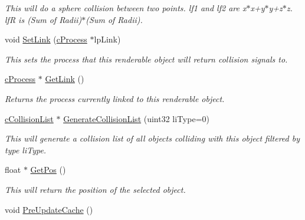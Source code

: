 \begin{DoxyCompactItemize}
\begin{DoxyCompactList}\small\item\em This will do a sphere collision between two points. lf1 and lf2 are x$\ast$x+y$\ast$y+z$\ast$z. lfR is (Sum of Radii)$\ast$(Sum of Radii). \end{DoxyCompactList}\item 
void \hyperlink{classc_collision_object_a69070a16277612a9ac52c84a05d03e80}{SetLink} (\hyperlink{classc_process}{cProcess} $\ast$lpLink)
\begin{DoxyCompactList}\small\item\em This sets the process that this renderable object will return collision signals to. \end{DoxyCompactList}\item 
\hypertarget{classc_collision_object_ad6df8670340c6511beeaaf8fa2f296ec}{
\hyperlink{classc_process}{cProcess} $\ast$ \hyperlink{classc_collision_object_ad6df8670340c6511beeaaf8fa2f296ec}{GetLink} ()}
\label{classc_collision_object_ad6df8670340c6511beeaaf8fa2f296ec}

\begin{DoxyCompactList}\small\item\em Returns the process currently linked to this renderable object. \end{DoxyCompactList}\item 
\hypertarget{classc_collision_object_ad20aada1ced2fed153c45023806dcd31}{
\hyperlink{classc_collision_list}{cCollisionList} $\ast$ \hyperlink{classc_collision_object_ad20aada1ced2fed153c45023806dcd31}{GenerateCollisionList} (uint32 liType=0)}
\label{classc_collision_object_ad20aada1ced2fed153c45023806dcd31}

\begin{DoxyCompactList}\small\item\em This will generate a collision list of all objects colliding with this object filtered by type liType. \end{DoxyCompactList}\item 
\hypertarget{classc_collision_object_afce8da5d2890ac355da6bc5d3ad4ca1d}{
float $\ast$ \hyperlink{classc_collision_object_afce8da5d2890ac355da6bc5d3ad4ca1d}{GetPos} ()}
\label{classc_collision_object_afce8da5d2890ac355da6bc5d3ad4ca1d}

\begin{DoxyCompactList}\small\item\em This will return the position of the selected object. \end{DoxyCompactList}\item 
\hypertarget{classc_collision_object_a86932ba04099dd34874fd3ada314168c}{
void \hyperlink{classc_collision_object_a86932ba04099dd34874fd3ada314168c}{PreUpdateCache} ()}
\label{classc_collision_object_a86932ba04099dd34874fd3ada314168c}


\end{DoxyCompactItemize}
